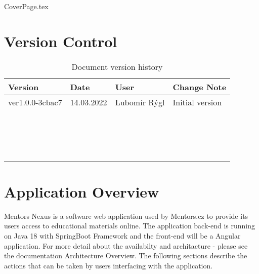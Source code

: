 \documentclass{article}
\begin{document}
    {CoverPage.tex}
    \tableofcontents
    \listoffigures
    \listoftables
    \lstlistoflistings
\newpage
   

\section{Version Control}
\begin{small}
    \begin{longtable}[h]{|L{3cm}|L{2cm}|L{3cm}|L{4cm}|} 
        \hline
        Version&Date&User&Change Note\\
        \hline
        \endhead%
        ver1.0.0-3cbac7&14.03.2022&Lubomír Rýgl&Initial version\\        \hline
        &&&\\        \hline
        &&&\\        \hline        
        &&&\\        \hline
        &&&\\        \hline   
        &&&\\        \hline
        &&&\\        \hline   
        &&&\\        \hline
        &&&\\        \hline   
        &&&\\        \hline
        &&&\\        \hline   
        &&&\\        \hline
        &&&\\        \hline   
        &&&\\        \hline
        &&&\\        \hline   
        &&&\\        \hline
        &&&\\        \hline   
        \caption{Document version history}
    \end{longtable}
\end{small}

\section{Application Overview}
Mentors Nexus is a software web application used by Mentors.cz to provide its users access to educational materials online. The application back-end is running on Java 18 with SpringBoot Framework and the front-end will be a Angular application. For more detail about the availabilty and architacture - please see the documentation Architecture Overview. The following sections describe the actions that can be taken by users interfacing with the application.
\end{document}
